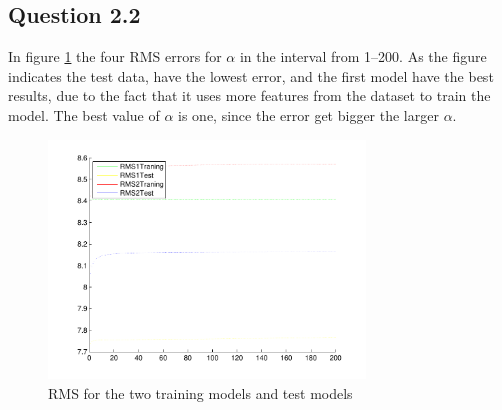 \subsection*{Question 2.2}

In figure \ref{fig:q22} the four RMS errors for $\alpha$ in the
interval from 1--200. As the figure indicates the test data, have the
lowest error, and the first model have the best results, due to the
fact that it uses more features from the dataset to train the
model. The best value of $\alpha$ is one, since the error get bigger
the larger $\alpha$.

\begin{figure}[!htbp]
  \centering
  \includegraphics[width=0.75\textwidth]{./images/Q2.pdf}
  \caption{RMS for the two training models and test models}
  \label{fig:q22}
\end{figure}

